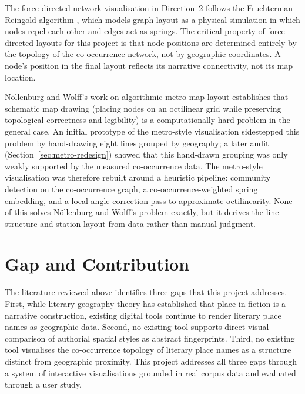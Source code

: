 \documentclass[logo,msc]{infthesis}
\begin{document}
The force-directed network visualisation in Direction~2 follows the Fruchterman-Reingold algorithm \cite{fruchterman1991}, which models graph layout as a physical simulation in which nodes repel each other and edges act as springs. The critical property of force-directed layouts for this project is that node positions are determined entirely by the topology of the co-occurrence network, not by geographic coordinates. A node's position in the final layout reflects its narrative connectivity, not its map location.
 
N{\"o}llenburg and Wolff's work on algorithmic metro-map layout \cite{nollenburg2006} establishes that schematic map drawing (placing nodes on an octilinear grid while preserving topological correctness and legibility) is a computationally hard problem in the general case. An initial prototype of the metro-style visualisation sidestepped this problem by hand-drawing eight lines grouped by geography; a later audit (Section~\ref{sec:metro-redesign}) showed that this hand-drawn grouping was only weakly supported by the measured co-occurrence data. The metro-style visualisation was therefore rebuilt around a heuristic pipeline: community detection on the co-occurrence graph, a co-occurrence-weighted spring embedding, and a local angle-correction pass to approximate octilinearity. None of this solves N{\"o}llenburg and Wolff's problem exactly, but it derives the line structure and station layout from data rather than manual judgment.
 
\section{Gap and Contribution}
 
The literature reviewed above identifies three gaps that this project addresses. First, while literary geography theory has established that place in fiction is a narrative construction, existing digital tools continue to render literary place names as geographic data. Second, no existing tool supports direct visual comparison of authorial spatial styles as abstract fingerprints. Third, no existing tool visualises the co-occurrence topology of literary place names as a structure distinct from geographic proximity. This project addresses all three gaps through a system of interactive visualisations grounded in real corpus data and evaluated through a user study.
 
 
\end{document}
